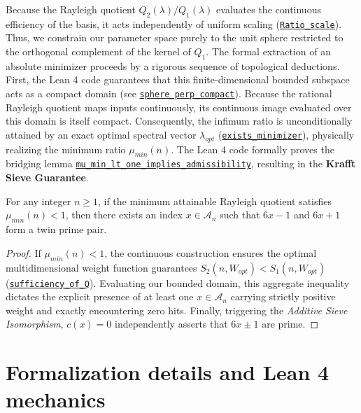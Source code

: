 \documentclass[lean]{AFM}
\renewcommand{\.}{\hskip .75pt}
\def\urlpfx{https://github.com/ElNando888/KrafftSieve/blob/v1.0}
\begin{document}
Because the Rayleigh quotient $Q_2(\lambda) / Q_1(\lambda)$ evaluates the continuous efficiency
of the basis, it acts independently of uniform scaling
(\href{\urlpfx/KrafftSieve/OptimalWeights.lean#L374}{\texttt{Ratio\_scale}}). Thus, we constrain
our parameter space purely to the unit sphere restricted to the orthogonal complement of the kernel
of $Q_1$. The formal extraction of an absolute minimizer proceeds by a rigorous sequence of
topological deductions. First, the Lean 4 code guarantees that this finite-dimensional bounded
subspace acts as a compact domain (see \href{\urlpfx/KrafftSieve/OptimalWeights.lean#L459}
{\texttt{sphere\_perp\_compact}}). Because the rational Rayleigh quotient maps inputs continuously,
its continuous image evaluated over this domain is itself compact. Consequently, the infimum ratio
is unconditionally attained by an exact optimal spectral vector $\lambda_{opt}$
(\href{\urlpfx/KrafftSieve/OptimalWeights.lean#L628}{\texttt{exists\_minimizer}}), physically
realizing the minimum ratio $\mu_{min}(n)$. The Lean 4 code formally
proves the bridging lemma \href{\urlpfx/KrafftSieve/OptimalWeights.lean#L188}
{\texttt{mu\_min\_lt\_one\_implies\_admissibility}}, resulting in
the \textbf{Krafft Sieve Guarantee}.

\begin{theorem}
For any integer $n \ge 1$, if the minimum attainable Rayleigh quotient satisfies $\mu_{min}(n) < 1$,
then there exists an index $x \in \mathcal{A}_n$ such that $6x-1$ and $6x+1$ form a twin prime pair.
\end{theorem}
\begin{proof}
If $\mu_{min}(n) < 1$, the continuous construction ensures the optimal multidimensional weight
function guarantees $S_2(n, W_{opt}) < S_1(n, W_{opt})$
(\href{\urlpfx/KrafftSieve/OptimalWeights.lean#L166}{\texttt{sufficiency\_of\_Q}}).
Evaluating our bounded domain, this aggregate inequality dictates the explicit presence of at least
one $x \in \mathcal{A}_n$ carrying strictly positive weight and exactly encountering zero hits.
Finally, triggering the \textit{Additive Sieve Isomorphism}, $c(x) = 0$ independently asserts
that $6x \pm 1$ are prime.
\end{proof}

\section{Formalization details and Lean 4 mechanics} \label{formalization}
\end{document}
